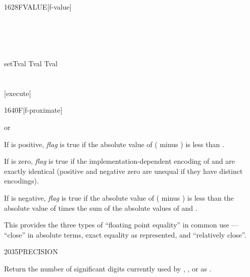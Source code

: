 \begin{worddef}{1628}{FVALUE}[f-value]
	\begin{testing} %
		\ttfamily
		 \\
		 \\
		 \\
		 \\[2ex]
		\word{:} setTval Tval   Tval \word{;} \\
		 \\[2ex]
		 \\
		\word{:} [execute]  \word{;}  \\
		\test[R]{\word{'} Tval \word{]} [execute] \word{[}}{2e0}
	\end{testing}
\end{worddef}


\begin{worddef}[Ftilde]{1640}{F\tilde}[f-proximate]
\item {}  or

	If  is positive, \emph{flag} is true if the absolute
	value of ( minus ) is less than .

	If  is zero, \emph{flag} is true if the
	implementation-dependent encoding of  and 
	are exactly identical (positive and negative zero are unequal if
	they have distinct encodings).

	If  is negative, \emph{flag} is true if the absolute value
	of ( minus ) is less than the absolute value of
	 times the sum of the absolute values of  and
	.

	\begin{rationale} %
		This provides the three types of ``floating point equality''
		in common use --- ``close'' in absolute terms, exact equality
		as represented, and ``relatively close''.
	\end{rationale}
\end{worddef}


\begin{worddef}{2035}{PRECISION}
\item {}

	Return the number of significant digits currently used by
	, , or  as .
\end{worddef}


